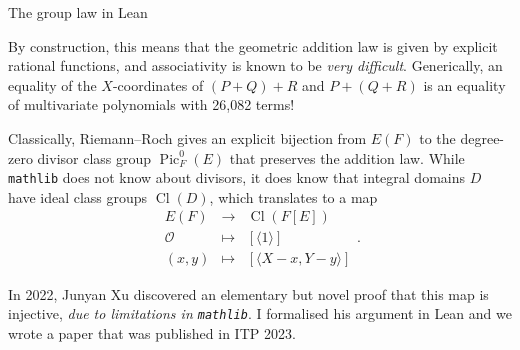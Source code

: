 \documentclass[10pt]{beamer}
\begin{document}
\begin{frame}[t]{The group law in Lean}

By construction, this means that the geometric addition law is given by explicit rational functions, and associativity is known to be \emph{very difficult}. \pause Generically, an equality of the $ X $-coordinates of $ (P + Q) + R $ and $ P + (Q + R) $ is an equality of multivariate polynomials with 26,082 terms!

\pause

\vspace{0.5cm} Classically, Riemann--Roch gives an explicit bijection from $ E(F) $ to the degree-zero divisor class group $ \operatorname{Pic}_F^0(E) $ that preserves the addition law. \pause While \texttt{mathlib} does not know about divisors, it does know that integral domains $ D $ have ideal class groups $ \operatorname{Cl}(D) $, which translates to a map
$$
\begin{array}{rcl}
E(F) & \longrightarrow & \operatorname{Cl}(F[E]) \\
\mathcal{O} & \longmapsto & [\langle 1 \rangle] \\
(x, y) & \longmapsto & [\langle X - x, Y - y \rangle]
\end{array}.
$$

\pause

In 2022, Junyan Xu discovered an elementary but novel proof that this map is injective, \emph{due to limitations in \texttt{mathlib}}. I formalised his argument in Lean and we wrote a paper that was published in ITP 2023.

\end{frame}
\end{document}
